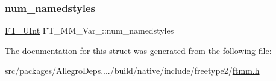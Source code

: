 \subsubsection{\texorpdfstring{num\+\_\+namedstyles}{num\_namedstyles}}
{\footnotesize\ttfamily \hyperlink{fttypes_8h_abcb8db4dbf35d2b55a9e8c7b0926dc52}{F\+T\+\_\+\+U\+Int} F\+T\+\_\+\+M\+M\+\_\+\+Var\+\_\+\+::num\+\_\+namedstyles}



The documentation for this struct was generated from the following file\+:\begin{DoxyCompactItemize}
\item 
src/packages/\+Allegro\+Deps..../build/native/include/freetype2/\hyperlink{ftmm_8h}{ftmm.\+h}\end{DoxyCompactItemize}
